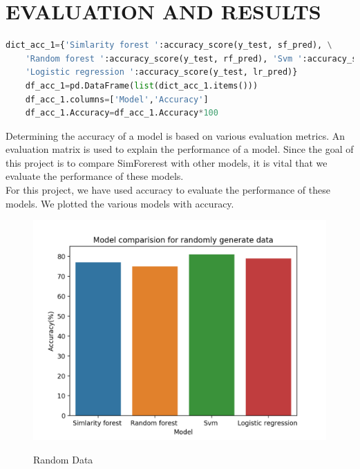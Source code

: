 \documentclass{article}
\begin{document}
\section{EVALUATION AND RESULTS}

\begin{lstlisting}[caption={Model Evaluation with Accuracy},label={lst:label},language=python]
dict_acc_1={'Simlarity forest ':accuracy_score(y_test, sf_pred), \
    'Random forest ':accuracy_score(y_test, rf_pred), 'Svm ':accuracy_score(y_test, svm_pred),\
    'Logistic regression ':accuracy_score(y_test, lr_pred)}
    df_acc_1=pd.DataFrame(list(dict_acc_1.items()))
    df_acc_1.columns=['Model','Accuracy']
    df_acc_1.Accuracy=df_acc_1.Accuracy*100
\end{lstlisting}
Determining the accuracy of a model is based on various evaluation metrics. An evaluation matrix is used to explain the performance of a model. Since the goal of this project is to compare SimForerest with other models, it is vital that we evaluate the performance of these models.\\

\noindent For this project, we have used accuracy to evaluate the performance of these models. We plotted the various models with accuracy.

\begin{figure}[H]
    \caption{Random Data}
    \includegraphics{randomdata}
    \label{fig:randata}
\end{figure}
\end{document}
